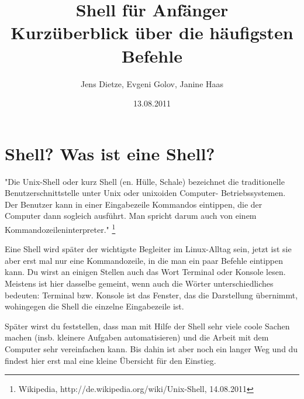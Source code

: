 \documentclass[a4paper,10pt]{article}
\title{Shell für Anfänger\\
\large{Kurzüberblick über die häufigsten Befehle}}
\author{Jens Dietze, Evgeni Golov, Janine Haas}
\date{13.08.2011}
\begin{document}
\maketitle

\tableofcontents
\pagebreak
\parindent 0pt
\parskip 10pt
\section{Shell? Was ist eine Shell?}
"Die Unix-Shell oder kurz Shell (en. Hülle, Schale) bezeichnet die 
traditionelle Benutzerschnittstelle unter Unix oder unixoiden Computer-
Betriebssystemen. Der Benutzer kann in einer Eingabezeile Kommandos 
eintippen, die der Computer dann sogleich ausführt. Man spricht darum 
auch von einem Kommandozeileninterpreter."
\footnote{Wikipedia, http://de.wikipedia.org/wiki/Unix-Shell, 14.08.2011}

Eine Shell wird später der wichtigste Begleiter im Linux-Alltag sein, 
jetzt ist sie aber erst mal nur eine Kommandozeile, in die man ein paar 
Befehle eintippen kann. Du wirst an einigen Stellen auch das Wort 
Terminal oder Konsole lesen. Meistens ist hier dasselbe gemeint, wenn 
auch die Wörter unterschiedliches bedeuten: Terminal bzw. Konsole ist 
das Fenster, das die Darstellung übernimmt, wohingegen die Shell die 
einzelne Eingabezeile ist.

Später wirst du feststellen, dass man mit Hilfe der Shell sehr viele 
coole Sachen machen (insb. kleinere Aufgaben automatisieren) und die 
Arbeit mit dem Computer sehr vereinfachen kann. Bis dahin ist aber noch 
ein langer Weg und du findest hier erst mal eine kleine Übersicht für 
den Einstieg.
\end{document}
